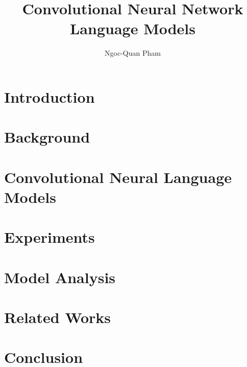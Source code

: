 \documentclass[12pt]{report}
\begin{document}
\title{Convolutional Neural Network Language Models}
\author{Ngoc-Quan Pham}

\beforepreface
%

\afterpreface


\chapter{Introduction}
\label{c:intro}


\chapter{Background}
\label{c:review}

%


\chapter{Convolutional Neural Language Models}
\label{c:cnn}


\chapter{Experiments}
\label{c:exp}


\chapter{Model Analysis}
\label{c:analysis}


\chapter{Related Works}
\label{c:related}


\chapter{Conclusion}
\label{c:conc}

\end{document}
